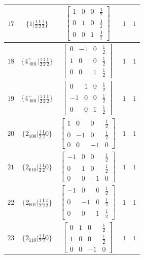 \documentclass[fleqn,8pt]{jsarticle}
\begin{document}
\begin{longtable}{ccccc}
$ 17 $ & $ \{1|\frac{1}{2} \frac{1}{2} \frac{1}{2}\} $ & $ \begin{bmatrix} 1 & 0 & 0 & \frac{1}{2} \\ 0 & 1 & 0 & \frac{1}{2} \\ 0 & 0 & 1 & \frac{1}{2} \end{bmatrix} $ & $ 1 $ & $ 1 $ \\ \hline
$ 18 $ & $ \{4^{+}_{\,\,001}|\frac{1}{2} \frac{1}{2} \frac{1}{2}\} $ & $ \begin{bmatrix} 0 & -1 & 0 & \frac{1}{2} \\ 1 & 0 & 0 & \frac{1}{2} \\ 0 & 0 & 1 & \frac{1}{2} \end{bmatrix} $ & $ 1 $ & $ 1 $ \\ \hline
$ 19 $ & $ \{4^{-}_{\,\,001}|\frac{1}{2} \frac{1}{2} \frac{1}{2}\} $ & $ \begin{bmatrix} 0 & 1 & 0 & \frac{1}{2} \\ -1 & 0 & 0 & \frac{1}{2} \\ 0 & 0 & 1 & \frac{1}{2} \end{bmatrix} $ & $ 1 $ & $ 1 $ \\ \hline
$ 20 $ & $ \{2{}_{100}|\frac{1}{2} \frac{1}{2} 0\} $ & $ \begin{bmatrix} 1 & 0 & 0 & \frac{1}{2} \\ 0 & -1 & 0 & \frac{1}{2} \\ 0 & 0 & -1 & 0 \end{bmatrix} $ & $ 1 $ & $ 1 $ \\ \hline
$ 21 $ & $ \{2{}_{010}|\frac{1}{2} \frac{1}{2} 0\} $ & $ \begin{bmatrix} -1 & 0 & 0 & \frac{1}{2} \\ 0 & 1 & 0 & \frac{1}{2} \\ 0 & 0 & -1 & 0 \end{bmatrix} $ & $ 1 $ & $ 1 $ \\ \hline
$ 22 $ & $ \{2{}_{001}|\frac{1}{2} \frac{1}{2} \frac{1}{2}\} $ & $ \begin{bmatrix} -1 & 0 & 0 & \frac{1}{2} \\ 0 & -1 & 0 & \frac{1}{2} \\ 0 & 0 & 1 & \frac{1}{2} \end{bmatrix} $ & $ 1 $ & $ 1 $ \\ \hline
$ 23 $ & $ \{2{}_{110}|\frac{1}{2} \frac{1}{2} 0\} $ & $ \begin{bmatrix} 0 & 1 & 0 & \frac{1}{2} \\ 1 & 0 & 0 & \frac{1}{2} \\ 0 & 0 & -1 & 0 \end{bmatrix} $ & $ 1 $ & $ 1 $ \\ \hline

\end{longtable}
\end{document}

